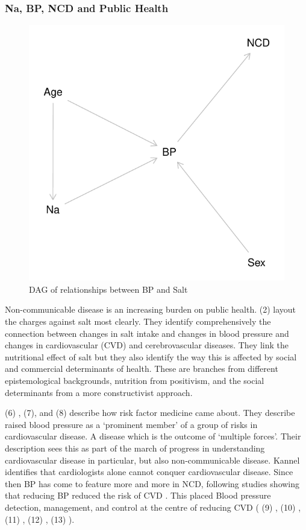 \documentclass[
]{article}
\begin{document}
\hypertarget{na-bp-ncd-and-public-health}{%
\subsubsection{Na, BP, NCD and Public
Health}\label{na-bp-ncd-and-public-health}}

\begin{figure}
\centering
\includegraphics{nextlevel_files/figure-latex/fig-dagNa-1.pdf}
\caption{DAG of relationships between BP and Salt}
\end{figure}

Non-communicable disease is an increasing burden on public health. (2)
layout the charges against salt most clearly. They identify
comprehensively the connection between changes in salt intake and
changes in blood pressure and changes in cardiovascular (CVD) and
cerebrovascular diseases. They link the nutritional effect of salt but
they also identify the way this is affected by social and commercial
determinants of health. These are branches from different
epistemological backgrounds, nutrition from positivism, and the social
determinants from a more constructivist approach.

(6) , (7), and (8) describe how risk factor medicine came about. They
describe raised blood pressure as a `prominent member' of a group of
risks in cardiovascular disease. A disease which is the outcome of
`multiple forces'. Their description sees this as part of the march of
progress in understanding cardiovascular disease in particular, but also
non-communicable disease. Kannel identifies that cardiologists alone
cannot conquer cardiovascular disease. Since then BP has come to feature
more and more in NCD, following studies showing that reducing BP reduced
the risk of CVD . This placed Blood pressure detection, management, and
control at the centre of reducing CVD ( (9) , (10) , (11) , (12) , (13)
).
\end{document}

